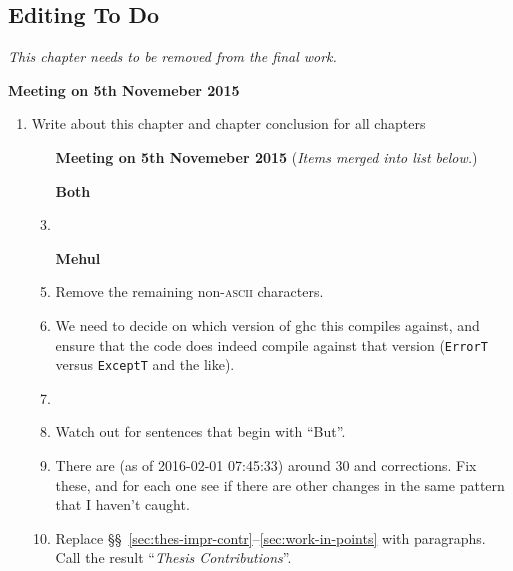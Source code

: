 
\begin{scope}
\nolinenumbers
\chapter{Editing To Do}\label{chap:to-do}

\textit{\color{red} This chapter needs to be removed from the final
  work.}

\textbf{Meeting on 5th Novemeber 2015} 
\begin{enumerate}
\item Write about this chapter and chapter conclusion for all chapters

\begin{enumerate}
\item [\textbf{Meeting on 5th Novemeber 2015}]
  (\textit{Items merged into list below.})

\item [\textbf{Both}]

\item

\item [\textbf{Mehul}]

\item Remove the remaining non-\textsc{ascii} characters.

\item
  We need to decide on which version of ghc this compiles against, and ensure that the code does indeed compile
  against that version (\Verb!ErrorT! versus \Verb!ExceptT! and the like).

\item

\item
  Watch out for sentences that begin with ``But''.

\item
  There are (as of 2016-02-01 07:45:33) around 30  and  corrections.  Fix these, and
  for each one see if there are other changes in the same pattern that I haven't caught.

\item
  Replace \S\S~\ref{sec:thes-impr-contr}--\ref{sec:work-in-points} with
  paragraphs.  Call the result ``\textsl{Thesis Contributions}''.


\end{enumerate}
\end{enumerate}
\end{scope}
